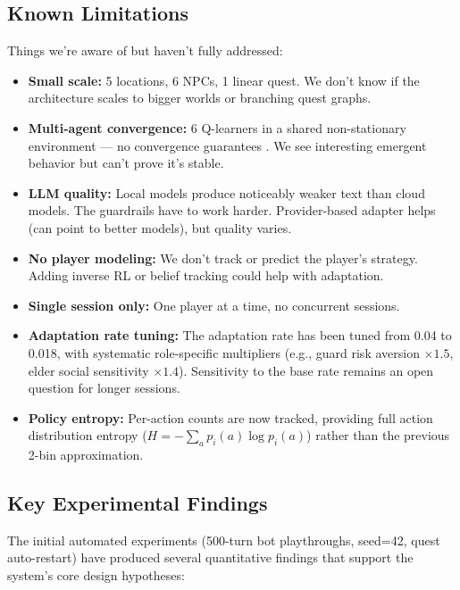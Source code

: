 \subsection{Known Limitations}

Things we're aware of but haven't fully addressed:

\begin{itemize}
    \item \textbf{Small scale:} 5 locations, 6 NPCs, 1 linear quest. We don't know if the architecture scales to bigger worlds or branching quest graphs.
    \item \textbf{Multi-agent convergence:} 6 Q-learners in a shared non-stationary environment --- no convergence guarantees \cite{bowling2002multiagent}. We see interesting emergent behavior but can't prove it's stable.
    \item \textbf{LLM quality:} Local models produce noticeably weaker text than cloud models. The guardrails have to work harder. Provider-based adapter helps (can point to better models), but quality varies.
    \item \textbf{No player modeling:} We don't track or predict the player's strategy. Adding inverse RL or belief tracking could help with adaptation.
    \item \textbf{Single session only:} One player at a time, no concurrent sessions.
    \item \textbf{Adaptation rate tuning:} The adaptation rate has been tuned from 0.04 to 0.018, with systematic role-specific multipliers (e.g., guard risk aversion $\times 1.5$, elder social sensitivity $\times 1.4$). Sensitivity to the base rate remains an open question for longer sessions.
    \item \textbf{Policy entropy:} Per-action counts are now tracked, providing full action distribution entropy ($H = -\sum_a p_i(a) \log p_i(a)$) rather than the previous 2-bin approximation.
\end{itemize}

\subsection{Key Experimental Findings}

The initial automated experiments (500-turn bot playthroughs, seed=42, quest auto-restart) have produced several quantitative findings that support the system's core design hypotheses:

